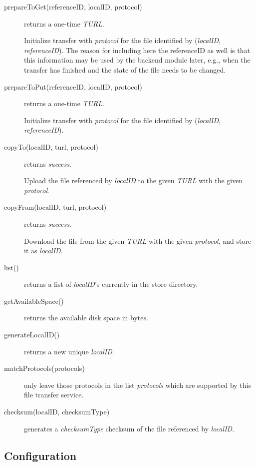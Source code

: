 \documentclass{book}
\begin{document}
\begin{description}
    \item[prepareToGet(referenceID, localID, protocol)] returns a one-time \emph{TURL}.
    
    Initialize transfer with \emph{protocol} for the file identified by (\emph{localID}, \emph{referenceID}). The reason for including here the referenceID as well is that this information may be used by the backend module later, e.g., when the transfer has finished and the state of the file needs to be changed.
    
    \item[prepareToPut(referenceID, localID, protocol)] returns a one-time \emph{TURL}.
    
    Initialize transfer with \emph{protocol} for the file identified by (\emph{localID}, \emph{referenceID}).
    
    \item[copyTo(localID, turl, protocol)] returns \emph{success}.
    
    Upload the file referenced by \emph{localID} to the given \emph{TURL} with the given \emph{protocol}.
    
    \item[copyFrom(localID, turl, protocol)] returns \emph{success}.
    
    Download the file from the given \emph{TURL} with the given \emph{protocol}, and store it as \emph{localID}.
    
    \item[list()] returns a list of \emph{localID}'s currently in the store directory.
    \item[getAvailableSpace()] returns the available disk space in bytes.
    \item[generateLocalID()] returns a new unique \emph{localID}.
    \item[matchProtocols(protocols)] only leave those protocols in the list \emph{protocols} which are supported by this file transfer service.
    \item[checksum(localID, checksumType)] generates a \emph{checksumType} checksum of the file referenced by \emph{localID}.
\end{description}


\subsection{Configuration} %
\end{document}
